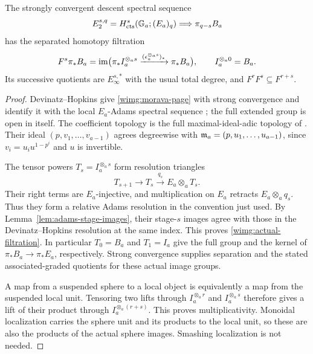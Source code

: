 \begin{lemma}\label{wimg:descent}
The strongly convergent descent spectral sequence
\begin{equation}\label{wimg:morava-page}
 E_2^{s,q}=H^s_{\operatorname{cts}}(\mathbb G_a;(E_a)_q)
 \Longrightarrow\pi_{q-s}B_a
\end{equation}
has the separated homotopy filtration
\begin{equation}\label{wimg:actual-filtration}
 F^s\pi_*B_a
 =\operatorname{im}\bigl(\pi_*I_a^{\otimes_a s}
       \xrightarrow{(\epsilon_a^{\otimes_a s})_*}\pi_*B_a\bigr),
 \qquad I_a^{\otimes_a0}=B_a.
\end{equation}
Its successive quotients are $E_\infty^{s,*}$ with the usual total
degree, and $F^rF^s\subseteq F^{r+s}$.
\end{lemma}
\begin{proof}
Devinatz--Hopkins give \eqref{wimg:morava-page} with strong convergence
and identify it with the local $E_a$-Adams spectral sequence
\cite[Theorem~1(iii)--(iv)]{dh2004}; the full extended group is open
in itself. The coefficient topology is the full maximal-ideal-adic
topology of \cite[Remark~1.3]{dh2004}. Their ideal
$(p,v_1,\ldots,v_{a-1})$ agrees degreewise with
$\mathfrak m_a=(p,u_1,\ldots,u_{a-1})$, since
$v_i=u_i u^{1-p^i}$ and $u$ is invertible.

The tensor powers $T_s=I_a^{\otimes_a s}$ form resolution triangles
\begin{equation}\label{wimg:power-triangles}
 T_{s+1}\longrightarrow T_s
     \xrightarrow{q_s}E_a\otimes_a T_s.
\end{equation}
Their right terms are $E_a$-injective, and multiplication on $E_a$
retracts $E_a\otimes_a q_s$. Thus they form a relative Adams
resolution in the convention just used. By
Lemma~\ref{lem:adams-stage-images}, their stage-$s$ images agree
with those in the Devinatz--Hopkins resolution at the same index.
This proves \eqref{wimg:actual-filtration}. In particular $T_0=B_a$
and $T_1=I_a$ give the full group and the kernel of
$\pi_*B_a\to\pi_*E_a$, respectively. Strong convergence supplies
separation and the stated associated-graded quotients for these
actual image groups.

A map from a suspended sphere to a local object is equivalently a
map from the suspended local unit. Tensoring two lifts through
$I_a^{\otimes_a r}$ and $I_a^{\otimes_a s}$ therefore gives a lift
of their product through $I_a^{\otimes_a(r+s)}$. This proves
multiplicativity. Monoidal localization carries the sphere unit
and its products to the local unit, so these are also the products
of the actual sphere images. Smashing localization is not needed.
\end{proof}

